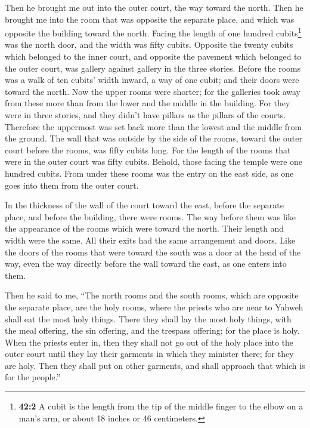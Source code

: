 \begin{paracol}{2}
\begin{otherlanguage}{english}
 Then he brought me out into the outer court, the way
toward the north. Then he brought me into the room that was opposite the
separate place, and which was opposite the building toward the north.
 Facing the length of one hundred cubits\footnote{\textbf{42:2}
  A cubit is the length from the tip of the middle finger to the elbow
  on a man's arm, or about 18 inches or 46 centimeters.} was the north
door, and the width was fifty cubits.  Opposite the twenty
cubits which belonged to the inner court, and opposite the pavement
which belonged to the outer court, was gallery against gallery in the
three stories.  Before the rooms was a walk of ten cubits'
width inward, a way of one cubit; and their doors were toward the north.
 Now the upper rooms were shorter; for the galleries took
away from these more than from the lower and the middle in the building.
 For they were in three stories, and they didn't have
pillars as the pillars of the courts. Therefore the uppermost was set
back more than the lowest and the middle from the ground. 
The wall that was outside by the side of the rooms, toward the outer
court before the rooms, was fifty cubits long.  For the
length of the rooms that were in the outer court was fifty cubits.
Behold, those facing the temple were one hundred cubits. 
From under these rooms was the entry on the east side, as one goes into
them from the outer court.

 In the thickness of the wall of the court toward the
east, before the separate place, and before the building, there were
rooms.  The way before them was like the appearance of
the rooms which were toward the north. Their length and width were the
same. All their exits had the same arrangement and doors.
 Like the doors of the rooms that were toward the south
was a door at the head of the way, even the way directly before the wall
toward the east, as one enters into them.

 Then he said to me, ``The north rooms and the south
rooms, which are opposite the separate place, are the holy rooms, where
the priests who are near to Yahweh shall eat the most holy things. There
they shall lay the most holy things, with the meal offering, the sin
offering, and the trespass offering; for the place is holy.
 When the priests enter in, then they shall not go out of
the holy place into the outer court until they lay their garments in
which they minister there; for they are holy. Then they shall put on
other garments, and shall approach that which is for the people.''


\end{otherlanguage}
\end{paracol}
